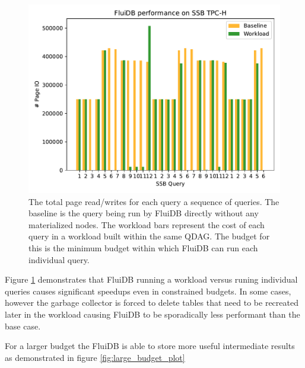 \begin{figure}[p]
\centering
\includegraphics[width=.9\linewidth]{./plans/io_perf_22000.pdf}
\caption{\label{fig:min_budget_plot}
  The total page read/writes for each query a sequence of queries. The
  baseline is the query being run by FluiDB directly without any
  materialized nodes. The workload bars represent the cost of each
  query in a workload built within the same QDAG. The budget for this
  is the minimum budget within which FluiDB can run each individual
  query.}
\end{figure}

Figure \ref{fig:min_budget_plot} demonstrates that FluiDB running a
workload versus runing individual queries causes significant speedups
even in constrained budgets. In some cases, however the garbage
collector is forced to delete tables that need to be recreated later
in the workload causing FluiDB to be sporadically less performant than
the base case.

For a larger budget the FluiDB is able to store more useful
intermediate results as demonstrated in figure \ref{fig:large_budget_plot}

